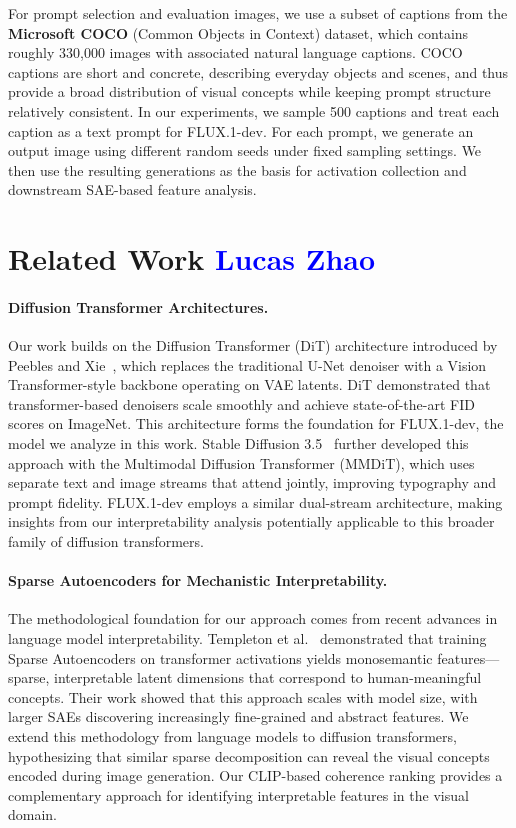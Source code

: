 \documentclass{article}
\begin{document}
For prompt selection and evaluation images, we use a subset of captions from the \textbf{Microsoft COCO} (Common Objects in Context) dataset, which contains roughly 330{,}000 images with associated natural language captions. COCO captions are short and concrete, describing everyday objects and scenes, and thus provide a broad distribution of visual concepts while keeping prompt structure relatively consistent. In our experiments, we sample 500 captions and treat each caption as a text prompt for FLUX.1-dev. For each prompt, we generate an output image using different random seeds under fixed sampling settings. We then use the resulting generations as the basis for activation collection and downstream SAE-based feature analysis.


\section{Related Work \textcolor{blue}{Lucas Zhao}}

\paragraph{Diffusion Transformer Architectures.}
Our work builds on the Diffusion Transformer (DiT) architecture introduced by Peebles and Xie~\citep{PeeblesXie2023DiT}, which replaces the traditional U-Net denoiser with a Vision Transformer-style backbone operating on VAE latents. DiT demonstrated that transformer-based denoisers scale smoothly and achieve state-of-the-art FID scores on ImageNet. This architecture forms the foundation for FLUX.1-dev, the model we analyze in this work. Stable Diffusion 3.5~\citep{SD35HF} further developed this approach with the Multimodal Diffusion Transformer (MMDiT), which uses separate text and image streams that attend jointly, improving typography and prompt fidelity. FLUX.1-dev employs a similar dual-stream architecture, making insights from our interpretability analysis potentially applicable to this broader family of diffusion transformers.

\paragraph{Sparse Autoencoders for Mechanistic Interpretability.}
The methodological foundation for our approach comes from recent advances in language model interpretability. Templeton et al.~\citep{templeton2024scaling} demonstrated that training Sparse Autoencoders on transformer activations yields monosemantic features---sparse, interpretable latent dimensions that correspond to human-meaningful concepts. Their work showed that this approach scales with model size, with larger SAEs discovering increasingly fine-grained and abstract features. We extend this methodology from language models to diffusion transformers, hypothesizing that similar sparse decomposition can reveal the visual concepts encoded during image generation. Our CLIP-based coherence ranking provides a complementary approach for identifying interpretable features in the visual domain.
\end{document}
